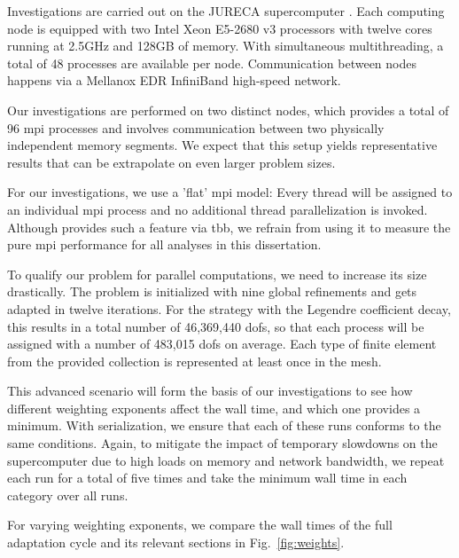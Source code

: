
Investigations are carried out on the JURECA supercomputer \parencite{krause2016}. Each computing node is equipped with two Intel Xeon E5-2680 v3 processors with twelve cores running at 2.5GHz and 128GB of memory. With simultaneous multithreading, a total of 48 processes are available per node. Communication between nodes happens via a Mellanox EDR InfiniBand high-speed network.

Our investigations are performed on two distinct nodes, which provides a total of 96 \gls{mpi} processes and involves communication between two physically independent memory segments. We expect that this setup yields representative results that can be extrapolate on even larger problem sizes.

For our investigations, we use a 'flat' \gls{mpi} model: Every thread will be assigned to an individual \gls{mpi} process and no additional thread parallelization is invoked. Although \dealii{} provides such a feature via \gls{tbb}, we refrain from using it to measure the pure \gls{mpi} performance for all analyses in this dissertation.


To qualify our problem for parallel computations, we need to increase its size drastically. The problem is initialized with nine global refinements and gets adapted in twelve iterations. For the strategy with the Legendre coefficient decay, this results in a total number of 46,369,440 \glspl{dof}, so that each process will be assigned with a number of 483,015 \glspl{dof} on average. Each type of finite element from the provided collection is represented at least once in the mesh.

This advanced scenario will form the basis of our investigations to see how different weighting exponents affect the wall time, and which one provides a minimum. With serialization, we ensure that each of these runs conforms to the same conditions. Again, to mitigate the impact of temporary slowdowns on the supercomputer due to high loads on memory and network bandwidth, we repeat each run for a total of five times and take the minimum wall time in each category over all runs.


For varying weighting exponents, we compare the wall times of the full adaptation cycle and its relevant sections
in Fig.~\ref{fig:weights}.

